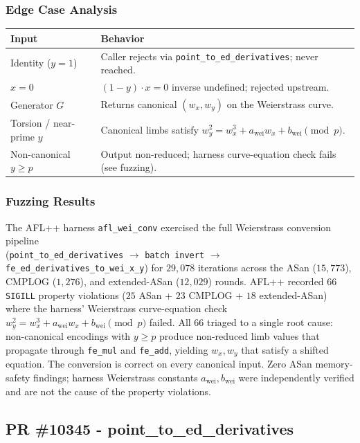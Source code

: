 \documentclass[12pt,titlepage,table]{article}
\begin{document}
\subsubsection{Edge Case Analysis}
\begin{table}[htbp]
\centering
{
\begin{tabular}{| l | l |}
\hline
\textbf{Input} & \textbf{Behavior} \\
\hline
\hline
Identity ($y = 1$) & Caller rejects via \verb+point_to_ed_derivatives+; never reached. \\
$x = 0$ & $(1 - y) \cdot x = 0$ inverse undefined; rejected upstream. \\
Generator $G$ & Returns canonical $(w_x, w_y)$ on the Weierstrass curve. \\
Torsion / near-prime $y$ & Canonical limbs satisfy $w_y^2 = w_x^3 + a_{\text{wei}} w_x + b_{\text{wei}} \pmod p$. \\
Non-canonical $y \geq p$ & Output non-reduced; harness curve-equation check fails (see fuzzing). \\
\hline
\end{tabular}}
\end{table}

\subsubsection{Fuzzing Results}
The AFL++ harness \verb+afl_wei_conv+ exercised the full Weierstrass conversion pipeline \\(\verb+point_to_ed_derivatives+ $\to$ \verb+batch invert+ $\to$ \verb+fe_ed_derivatives_to_wei_x_y+) for $29{,}078$ iterations across the ASan ($15{,}773$), CMPLOG ($1{,}276$), and extended-ASan ($12{,}029$) rounds.  AFL++ recorded $66$ \verb+SIGILL+ property violations ($25$ ASan + $23$ CMPLOG + $18$ extended-ASan) where the harness' Weierstrass curve-equation check $w_y^2 = w_x^3 + a_{\text{wei}} w_x + b_{\text{wei}} \pmod{p}$ failed.  All $66$ triaged to a single root cause: non-canonical encodings with $y \geq p$ produce non-reduced limb values that propagate through \verb+fe_mul+ and \verb+fe_add+, yielding $w_x, w_y$ that satisfy a shifted equation.  The conversion is correct on every canonical input.  Zero ASan memory-safety findings; harness Weierstrass constants $a_{\text{wei}}, b_{\text{wei}}$ were independently verified and are not the cause of the property violations.

\newpage
\subsection{PR \#10345 - point\_to\_ed\_derivatives}
\end{document}
